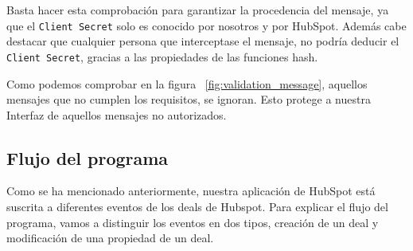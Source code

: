 Basta hacer esta comprobación para garantizar la procedencia del mensaje, ya que el \verb|Client Secret| solo es conocido por nosotros y por HubSpot. 
Además cabe destacar que cualquier persona que interceptase el mensaje, no podría deducir el \verb|Client Secret|, gracias a las propiedades de las funciones hash. 




Como podemos comprobar en la figura ~\ref{fig:validation_message}, aquellos mensajes que no cumplen los requisitos, se ignoran. Esto protege a nuestra Interfaz de aquellos mensajes no autorizados.




\subsection{Flujo del programa}

Como se ha mencionado anteriormente, nuestra aplicación de HubSpot está suscrita a diferentes eventos de los deals de Hubspot.
Para explicar el flujo del programa, vamos a distinguir los eventos en dos tipos, creación de un deal y modificación de una propiedad de un deal.

